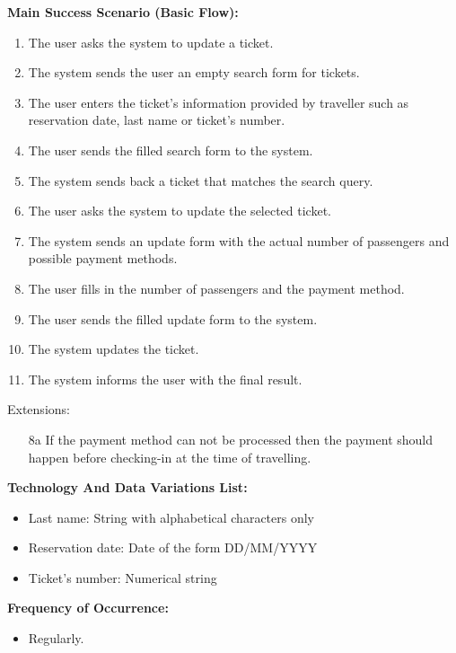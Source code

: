 \textbf{Main Success Scenario (Basic Flow):}
\begin{enumerate}
\item The user asks the system to update a ticket.
\item The system sends the user an empty search form for tickets.
\item The user enters the ticket's information provided by traveller such as reservation date, last name or ticket's number.
\item The user sends the filled search form to the system.
\item The system sends back a ticket that matches the search query.
\item The user asks the system to update the selected ticket.
\item The system sends an update form with the actual number of passengers and possible payment methods.
\item The user fills in the number of passengers and the payment method.
\item The user sends the filled update form to the system.
\item The system updates the ticket.
\item The system informs the user with the final result.
\end{enumerate}
Extensions:
\begin{enumerate}
\item[8a] If the payment method can not be processed then the payment should happen before checking-in at the time of travelling.
\end{enumerate}


\textbf{Technology And Data Variations List:} 
\begin{itemize}
    \item Last name: String with alphabetical characters only
    \item Reservation date: Date of the form DD/MM/YYYY
    \item Ticket's number: Numerical string
    \end{itemize}
\textbf{Frequency of Occurrence:} 
\begin{itemize}
    \item Regularly.
\end{itemize} 

